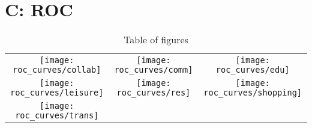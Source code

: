 \chapter{C: ROC}

    \begin{table}
        \centering
        \begin{tabular}{ccc}

\texttt{[image: roc\_curves/collab]} & \texttt{[image: roc\_curves/comm]} & \texttt{[image: roc\_curves/edu]} \\
             \texttt{[image: roc\_curves/leisure]} & \texttt{[image: roc\_curves/res]} & \texttt{[image: roc\_curves/shopping]} \\
             \texttt{[image: roc\_curves/trans]} & & \\
            \bottomrule
        \end{tabular}
        \caption{Table of figures}
        \label{tbl:table_of_figures}
    \end{table}
